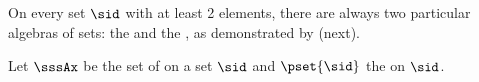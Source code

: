On every set $\sid$ with at least 2 elements,
there are always two particular algebras of sets:
the  and the ,
as demonstrated by  (next).
\begin{example}
\label{ex:ss_algebra_smallest}
Let $\sssAx$ be the set of   on a set $\sid$ and
$\pset{\sid}$ the   on $\sid$.
\end{example}


